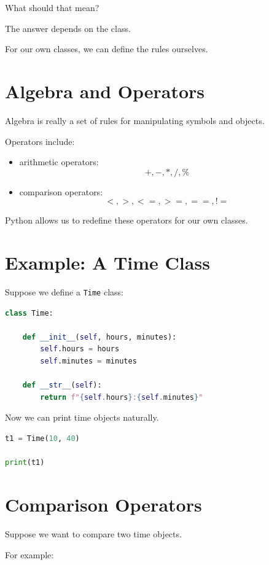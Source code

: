 \documentclass[11pt]{article}
\begin{document}
What should that mean?

The answer depends on the class.

For our own classes, we can define the rules ourselves.

\section{Algebra and Operators}

Algebra is really a set of rules for manipulating symbols and objects.

Operators include:

\begin{itemize}
    \item arithmetic operators:
    \[
    +, -, *, /, \%
    \]

    \item comparison operators:
    \[
    <, >, <=, >=, ==, !=
    \]
\end{itemize}

Python allows us to redefine these operators for our own classes.

\section{Example: A Time Class}

Suppose we define a \verb|Time| class:

\begin{lstlisting}[language=Python]
class Time:

    def __init__(self, hours, minutes):
        self.hours = hours
        self.minutes = minutes

    def __str__(self):
        return f"{self.hours}:{self.minutes}"
\end{lstlisting}

Now we can print time objects naturally.

\begin{lstlisting}[language=Python]
t1 = Time(10, 40)

print(t1)
\end{lstlisting}

\section{Comparison Operators}

Suppose we want to compare two time objects.

For example:
\end{document}
